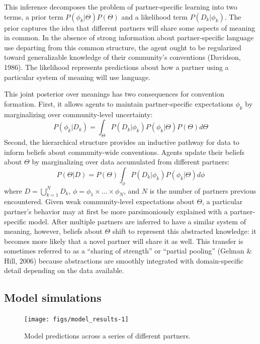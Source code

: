 \documentclass[10pt, letterpaper]{article}
\newenvironment{CodeChunk}{}{}
\begin{document}
This inference decomposes the problem of partner-specific learning into
two terms, a prior term \(P(\phi_k | \Theta)P(\Theta)\) and a likelihood
term \(P(D_k | \phi_k)\). The prior captures the idea that different
partners will share some aspects of meaning in common. In the absence of
strong information about partner-specific language use departing from
this common structure, the agent ought to be regularized toward
generalizable knowledge of their community's conventions (Davidson,
1986). The likelihood represents predictions about how a partner using a
particular system of meaning will use language.

This joint posterior over meanings has two consequences for convention
formation. First, it allows agents to maintain partner-specific
expectations \(\phi_k\) by marginalizing over community-level
uncertainty: \begin{equation}
P(\phi_k | D_k) = \int_{\Theta}P(D_k | \phi_k) P(\phi_k | \Theta) P(\Theta)  d\Theta
\end{equation} Second, the hierarchical structure provides an inductive
pathway for data to inform beliefs about community-wide conventions.
Agents update their beliefs about \(\Theta\) by marginalizing over data
accumulated from different partners: \begin{equation}
P(\Theta | D) = P(\Theta) \int_{\phi} P(D_k | \phi_k) P(\phi_k | \Theta) d\phi
\end{equation} where \(D = \bigcup_{k=1}^N D_k\),
\(\phi = \phi_1 \times \dots \times \phi_N\), and \(N\) is the number of
partners previous encountered. Given weak community-level expectations
about \(\Theta\), a particular partner's behavior may at first be more
parsimoniously explained with a partner-specific model. After multiple
partners are inferred to have a similar system of meaning, however,
beliefs about \(\Theta\) shift to represent this abstracted knowledge:
it becomes more likely that a novel partner will share it as well. This
transfer is sometimes referred to as a ``sharing of strength'' or
``partial pooling'' (Gelman \& Hill, 2006) because abstractions are
smoothly integrated with domain-specific detail depending on the data
available.

\hypertarget{model-simulations}{%
\subsection{Model simulations}\label{model-simulations}}

\begin{CodeChunk}
\begin{figure}[t!]

{\centering \texttt{[image: figs/model\_results-1]} 

}

\caption{\label{fig:simulations} Model predictions across a series of different partners.}\label{fig:model_results}
\end{figure}
\end{CodeChunk}
\end{document}
